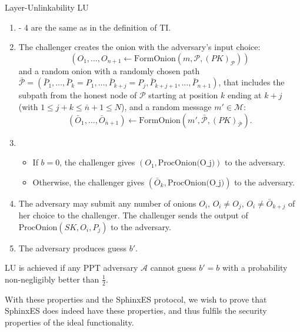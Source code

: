 \begin{definition}{Layer-Unlinkability LU}
  \begin{enumerate}
  \item - 4 are the same as in the definition of TI.
    \setcounter{enumi}{4}
  \item{The challenger creates the onion with the adversary's input
    choice:
    \[(O_1, \ldots, O_{n+1} \leftarrow \text{FormOnion}(m,
    \mathcal{P}, (PK)_{\mathcal{P}}))    
    \]
    and a random onion with a randomly chosen path \(\bar{\mathcal{P}}
    = (\bar{P}_1, \ldots, \bar{P}_k = P_1, \ldots, \bar{P}_{k+j} =
    P_j, \bar{P}_{k+j+1}, \ldots, \bar{P}_{n+1})\), that includes the
    subpath from the honest node of \(\mathcal{P}\) starting at
    position \(k\) ending at \(k+j\) (with \(1 \leq j+k \leq \bar{n}
    +1 \leq N\)), and a random message \(m' \in \mathcal{M}\):
    \[ (\bar{O}_1, \ldots, \bar{O}_{\bar{n} + 1}) \leftarrow
    \text{FormOnion}(m', \bar{\mathcal{P}}, (PK)_{\bar{\mathcal{P}}}).
    \]
  }
  \item{
    \begin{itemize}
      \item{If \(b = 0\), the challenger gives \((O_1,
        \text{ProcOnion(O_j)})\) to the adversary.}
      \item{Otherwise, the challenger gives \((\bar{O}_k,
        \text{ProcOnion(O_j)})\) to the adversary.}
    \end{itemize}
  }
  \item{The adversary may submit any number of onions \(O_i,\, O_i
    \neq O_j,\, O_i \neq \bar{O}_{k+j}\) of her choice to the
    challenger. The challenger sends the output of
    \(\text{ProcOnion}(SK, O_i, P_j)\) to the adversary.}
  \item{The adversary produces guess \(b'\).}
  \end{enumerate}
  LU is achieved if any PPT adversary \(\mathcal{A}\) cannot guess
  \(b' = b\) with a probability non-negligibly better than \(\frac{1}{2}\).
\end{definition}

With these properties and the SphinxES protocol, we wish to prove that
SphinxES does indeed have these properties, and thus fulfils the
security properties of the ideal functionality. 
